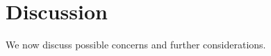\section{Discussion}
\label{sec:discussion}


We now discuss possible concerns and further considerations.





